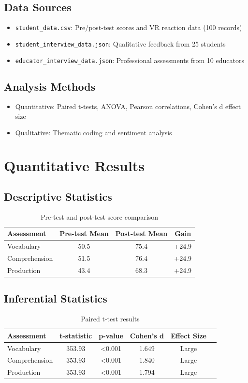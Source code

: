 \documentclass{article}
\begin{document}
\subsection{Data Sources}
\begin{itemize}
    \item \texttt{student\_data.csv}: Pre/post-test scores and VR reaction data (100 records)
    \item \texttt{student\_interview\_data.json}: Qualitative feedback from 25 students
    \item \texttt{educator\_interview\_data.json}: Professional assessments from 10 educators
\end{itemize}

\subsection{Analysis Methods}
\begin{itemize}
    \item Quantitative: Paired t-tests, ANOVA, Pearson correlations, Cohen's d effect size
    \item Qualitative: Thematic coding and sentiment analysis
\end{itemize}

\section{Quantitative Results}
\subsection{Descriptive Statistics}
\begin{table}[h]
\centering
\begin{tabular}{lccc}
\toprule
\textbf{Assessment} & \textbf{Pre-test Mean} & \textbf{Post-test Mean} & \textbf{Gain} \\
\midrule
Vocabulary & 50.5 & 75.4 & +24.9 \\
Comprehension & 51.5 & 76.4 & +24.9 \\
Production & 43.4 & 68.3 & +24.9 \\
\bottomrule
\end{tabular}
\caption{Pre-test and post-test score comparison}
\end{table}

\subsection{Inferential Statistics}
\begin{table}[h]
\centering
\begin{tabular}{lccccc}
\toprule
\textbf{Assessment} & \textbf{t-statistic} & \textbf{p-value} & \textbf{Cohen's d} & \textbf{Effect Size} \\
\midrule
Vocabulary & 353.93 & <0.001 & 1.649 & Large \\
Comprehension & 353.93 & <0.001 & 1.840 & Large \\
Production & 353.93 & <0.001 & 1.794 & Large \\
\bottomrule
\end{tabular}
\caption{Paired t-test results}
\end{table}
\end{document}
